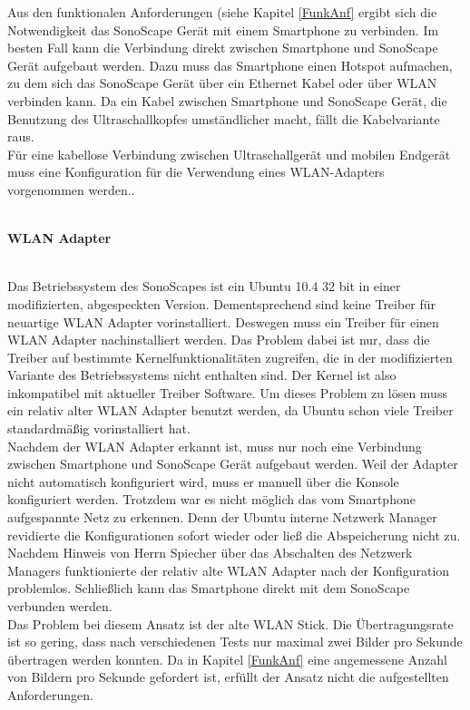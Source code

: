 Aus den funktionalen Anforderungen (siehe Kapitel \ref{FunkAnf} ergibt sich die Notwendigkeit das SonoScape Gerät mit einem Smartphone zu verbinden. Im besten Fall kann die Verbindung direkt zwischen Smartphone und SonoScape Gerät aufgebaut werden. Dazu muss das Smartphone einen Hotspot aufmachen, zu dem sich das SonoScape Gerät über ein Ethernet Kabel oder über WLAN verbinden kann. Da ein Kabel zwischen Smartphone und SonoScape Gerät, die Benutzung des Ultraschallkopfes umständlicher macht, fällt die Kabelvariante raus.\\
Für eine kabellose Verbindung zwischen Ultraschallgerät und mobilen Endgerät muss eine Konfiguration für die Verwendung eines WLAN-Adapters vorgenommen werden..\\\\
\begin{large}
\textbf{WLAN Adapter}\\\\
\end{large}
Das Betriebssystem des SonoScapes ist ein Ubuntu 10.4 32 bit in einer modifizierten, abgespeckten Version. Dementsprechend sind keine Treiber für neuartige WLAN Adapter vorinstalliert. Deswegen muss ein Treiber für einen WLAN Adapter nachinstalliert werden. Das Problem dabei ist nur, dass die Treiber auf bestimmte Kernelfunktionalitäten zugreifen, die in der modifizierten Variante des Betriebssystems nicht enthalten sind. Der Kernel ist also inkompatibel mit aktueller Treiber Software. Um dieses Problem zu lösen muss ein relativ alter WLAN Adapter benutzt werden, da Ubuntu schon viele Treiber standardmäßig vorinstalliert hat. \\
Nachdem der WLAN Adapter erkannt ist, muss nur noch eine Verbindung zwischen Smartphone und SonoScape Gerät aufgebaut werden. Weil der Adapter nicht automatisch konfiguriert wird, muss er manuell über die Konsole konfiguriert werden. Trotzdem war es nicht möglich das vom Smartphone aufgespannte Netz zu erkennen. Denn der Ubuntu interne Netzwerk Manager revidierte die Konfigurationen sofort wieder oder ließ die Abspeicherung nicht zu. Nachdem Hinweis von Herrn Spiecher über das Abschalten des Netzwerk Managers funktionierte der relativ alte WLAN Adapter nach der Konfiguration problemlos. Schließlich kann das Smartphone direkt mit dem SonoScape verbunden werden.\\
Das Problem bei diesem Ansatz ist der alte WLAN Stick. Die Übertragungsrate ist so gering, dass nach verschiedenen Tests nur maximal zwei Bilder pro Sekunde übertragen werden konnten. Da in Kapitel \ref{FunkAnf} eine angemessene Anzahl von Bildern pro Sekunde gefordert ist, erfüllt der Ansatz nicht die aufgestellten Anforderungen.\\\\
